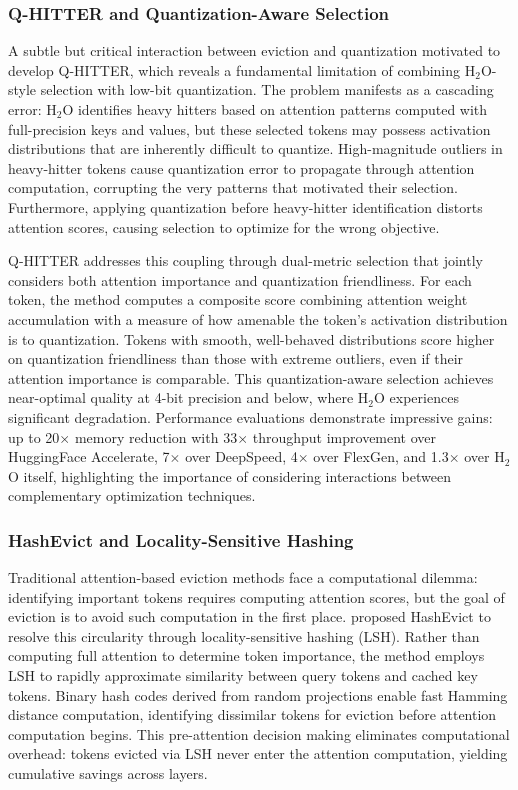 \subsubsection{Q-HITTER and Quantization-Aware Selection}

A subtle but critical interaction between eviction and quantization motivated \citet{kang2024qhitter} to develop Q-HITTER, which reveals a fundamental limitation of combining H$_2$O-style selection with low-bit quantization. The problem manifests as a cascading error: H$_2$O identifies heavy hitters based on attention patterns computed with full-precision keys and values, but these selected tokens may possess activation distributions that are inherently difficult to quantize. High-magnitude outliers in heavy-hitter tokens cause quantization error to propagate through attention computation, corrupting the very patterns that motivated their selection. Furthermore, applying quantization before heavy-hitter identification distorts attention scores, causing selection to optimize for the wrong objective.

Q-HITTER addresses this coupling through dual-metric selection that jointly considers both attention importance and quantization friendliness. For each token, the method computes a composite score combining attention weight accumulation with a measure of how amenable the token's activation distribution is to quantization. Tokens with smooth, well-behaved distributions score higher on quantization friendliness than those with extreme outliers, even if their attention importance is comparable. This quantization-aware selection achieves near-optimal quality at 4-bit precision and below, where H$_2$O experiences significant degradation. Performance evaluations demonstrate impressive gains: up to 20$\times$ memory reduction with 33$\times$ throughput improvement over HuggingFace Accelerate, 7$\times$ over DeepSpeed, 4$\times$ over FlexGen, and 1.3$\times$ over H$_2$O itself, highlighting the importance of considering interactions between complementary optimization techniques.

\subsubsection{HashEvict and Locality-Sensitive Hashing}

Traditional attention-based eviction methods face a computational dilemma: identifying important tokens requires computing attention scores, but the goal of eviction is to avoid such computation in the first place. \citet{liu2024hashevict} proposed HashEvict to resolve this circularity through locality-sensitive hashing (LSH). Rather than computing full attention to determine token importance, the method employs LSH to rapidly approximate similarity between query tokens and cached key tokens. Binary hash codes derived from random projections enable fast Hamming distance computation, identifying dissimilar tokens for eviction before attention computation begins. This pre-attention decision making eliminates computational overhead: tokens evicted via LSH never enter the attention computation, yielding cumulative savings across layers.

